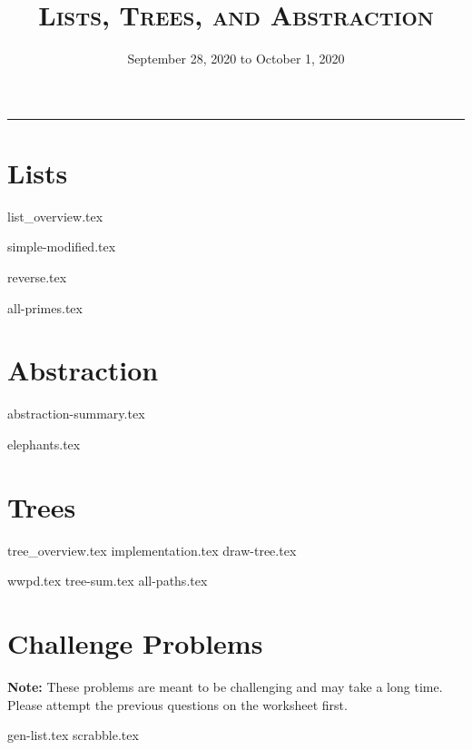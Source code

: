 \documentclass{exam}
\title{\textsc{Lists, Trees, and Abstraction}}
\date{September 28, 2020 to October 1, 2020}
\begin{document}
\maketitle
\rule{\textwidth}{0.15em}
\fontsize{12}{15}\selectfont


\section{Lists}
{list_overview.tex}
\begin{questions}
{simple-modified.tex}

\begin{blocksection}
{reverse.tex}
\end{blocksection}

\begin{blocksection}
{all-primes.tex}
\end{blocksection}
\end{questions}

\newpage
\section{Abstraction}
{abstraction-summary.tex}
\begin{questions}
{elephants.tex}
\end{questions}

\newpage
\section{Trees}
{tree_overview.tex}
{implementation.tex}
{draw-tree.tex}
\begin{questions}
{wwpd.tex}
{tree-sum.tex}
{all-paths.tex}
\end{questions}

\newpage
\section{Challenge Problems}
\textbf{Note:} These problems are meant to be challenging and may take a long time. Please attempt the previous questions on the worksheet first.
\begin{questions}
{gen-list.tex}
\newpage
{scrabble.tex}
\end{questions}
\end{document}
